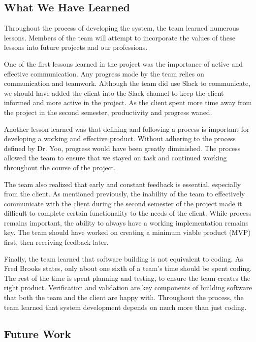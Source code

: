 \documentclass{article}
\begin{document}
\subsection{What We Have Learned}

Throughout the process of developing the system, the team learned numerous lessons. Members of the team will attempt to incorporate the values of these lessons into future projects and our professions. 

One of the first lessons learned in the project was the importance of active and effective communication. Any progress made by the team relies on communication and teamwork. Although the team did use Slack to communicate, we should have added the client into the Slack channel to keep the client informed and more active in the project. As the client spent more time away from the project in the second semester, productivity and progress waned.

Another lesson learned was that defining and following a process is important for developing a working and effective product. Without adhering to the process defined by Dr. Yoo, progress would have been greatly diminished. The process allowed the team to ensure that we stayed on task and continued working throughout the course of the project. 

The team also realized that early and constant feedback is essential, especially from the client. As mentioned previously, the inability of the team to effectively communicate with the client during the second semester of the project made it difficult to complete certain functionality to the needs of the client. While process remains important, the ability to always have a working implementation remains key. The team should have worked on creating a minimum viable product (MVP) first, then receiving feedback later. 

Finally, the team learned that software building is not equivalent to coding. As Fred Brooks states, only about one sixth of a team's time should be spent coding. The rest of the time is spent planning and testing, to ensure the team creates the right product. Verification and validation are key components of building software that both the team and the client are happy with. Throughout the process, the team learned that system development depends on much more than just coding. 

\subsection{Future Work}
\end{document}

